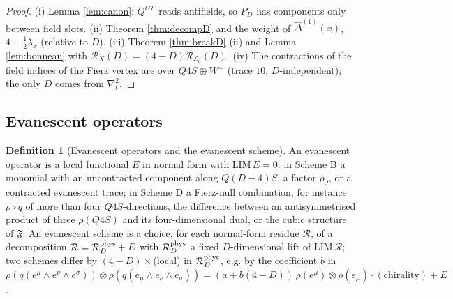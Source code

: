 \documentclass[11pt]{article}
\theoremstyle{definition}
\newtheorem{definition}{Definition}[section]
\numberwithin{equation}{section}
\begin{document}
\begin{proof}
(i) Lemma \ref{lem:canon}: $Q^{GF}$ reads antifields, so $P_D$ has components only between field slots. (ii) Theorem \ref{thm:decompD} and the weight of $\widehat\Delta^{(1)}(x)$, $4-\frac12\lambda_x$ (relative to $D$). (iii) Theorem \ref{thm:breakD} (ii) and Lemma \ref{lem:bonneau} with $\mathcal R_X(D)=(4-D)\mathcal R_{\mathscr L_0}(D)$. (iv) The contractions of the field indices of the Fierz vertex are over $Q4S\oplus W^\perp$ (trace $10$, $D$-independent); the only $D$ comes from $\nabla^2_l$.
\end{proof}

\subsection{Evanescent operators}

\begin{definition}[Evanescent operators and the evanescent scheme]
\label{def:evop}
An evanescent operator is a local functional $E$ in normal form with $\mathrm{LIM}\,E=0$: in Scheme B a monomial with an uncontracted component along $Q(D{-}4)S$, a factor $\rho_J$, or a contracted evanescent trace; in Scheme D a Fierz-null combination, for instance $\rho\circ q$ of more than four $Q4S$-directions, the difference between an antisymmetrised product of three $\rho(Q4S)$ and its four-dimensional dual, or the cubic structure of $\mathfrak F$. An evanescent scheme is a choice, for each normal-form residue $\mathcal R$, of a decomposition $\mathcal R=\mathcal R^{\rm phys}_D+E$ with $\mathcal R^{\rm phys}_D$ a fixed $D$-dimensional lift of $\mathrm{LIM}\,\mathcal R$; two schemes differ by $(4-D)\times$(local) in $\mathcal R^{\rm phys}_D$, e.g. by the coefficient $b$ in $\rho(q(e^\mu\wedge e^\nu\wedge e^\sigma))\otimes\rho(q(e_\mu\wedge e_\nu\wedge e_\sigma))=(a+b(4-D))\,\rho(e^\mu)\otimes\rho(e_\mu)\cdot(\text{chirality})+E$.
\end{definition}
\end{document}
